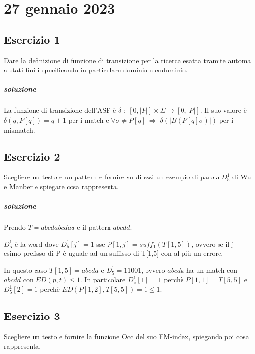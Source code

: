 \chapter{27 gennaio 2023}

\section{Esercizio 1}

Dare la definizione di funzione di transizione per la ricerca esatta tramite automa a stati finiti specificando in particolare dominio e codominio.

\paragraph{soluzione}

La funzione di transizione dell'ASF \`e $\delta \; : \; [0, |P|] \times \Sigma \rightarrow [0, |P|]$. Il suo valore \`e $\delta(q, P[q]) = q+1$ per i match e $\forall \sigma \neq P[q] \; \Rightarrow \; \delta(|B(P[q]\sigma)|)$ per i mismatch.

\section{Esercizio 2}

Scegliere un testo e un pattern e fornire su di essi un esempio di parola $D^1_5$ di Wu e Manber e spiegare cosa rappresenta.

\paragraph{soluzione} Prendo $T = abcdabcdaa$ e il pattern $abcdd$.

$D^1_5$ \`e la word dove $D^1_5[j] = 1$ sse $P[1,j] = suff_1(T[1,5])$, ovvero se il j-esimo prefisso di P \`e uguale ad un suffisso di T[1,5] con al pi\`u un errore.

In questo caso $T[1,5] = abcda$ e $D^1_5 = 11001$, ovvero $abcda$ ha un match con $abcdd$ con $ED(p,t) \leq 1$.
In particolare $D^1_5[1] = 1$ perch\`e $P[1,1] = T[5,5]$ e $D^1_5[2] = 1$ perch\`e $ED(P[1,2], T[5,5]) = 1 \leq 1$.

\section{Esercizio 3}

Scegliere un testo e fornire la funzione Occ del suo FM-index, spiegando poi cosa rappresenta.

